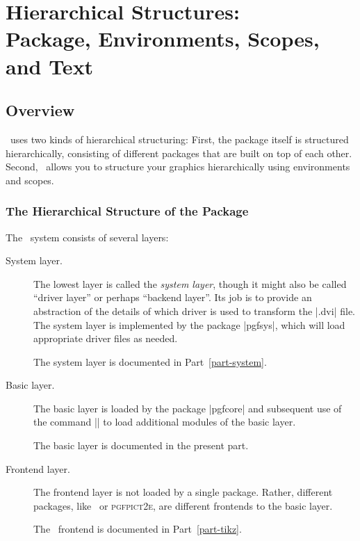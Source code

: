 %
%
%


\section[Hierarchical Structures: Package, Environments, Scopes, and Text]
        {Hierarchical Structures:\\
         Package, Environments, Scopes, and Text}

\subsection{Overview}

\pgfname\ uses two kinds of hierarchical structuring: First, the package itself
is structured hierarchically, consisting of different packages that are built
on top of each other. Second, \pgfname\ allows you to structure your graphics
hierarchically using environments and scopes.


\subsubsection{The  Hierarchical Structure of the Package}

The \pgfname\ system consists of several layers:
%
\begin{description}
    \item[System layer.]
        The lowest layer is called the \emph{system layer}, though it might
        also be called ``driver layer'' or perhaps ``backend layer''. Its job
        is to provide an abstraction of the details of which driver is used to
        transform the |.dvi| file. The system layer is implemented by the
        package |pgfsys|, which will load appropriate driver files as needed.

        The system layer is documented in Part~\ref{part-system}.
    \item[Basic layer.]
        The basic layer is loaded by the package |pgfcore| and subsequent use
        of the command |\usepgfmodule| to load additional modules of the basic
        layer.

        The basic layer is documented in the present part.
    \item[Frontend layer.]
        The frontend layer is not loaded by a single package. Rather, different
        packages, like \tikzname\ or \textsc{pgfpict2e}, are different
        frontends to the basic layer.

        The \tikzname\ frontend is documented in Part~\ref{part-tikz}.
\end{description}

